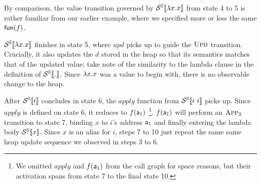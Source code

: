 By comparison, the value transition governed by $\mathcal{S}^{\mathbb{S}}\llbracket {\lambda x. x} \rrbracket$ from state
4 to 5 is rather familiar from our earlier example, where we specified more or
less the same $\mathsf{fun}(f)$.

$\mathcal{S}^{\mathbb{S}}\llbracket {\lambda x. x} \rrbracket$ finishes in state 5, where $upd$ picks up to guide the
$\textsc{Upd}$ transition. Crucially, it also updates the $d$ stored in the heap
so that its semantics matches that of the updated value; take note of the
similarity to the lambda clause in the definition of $\semst{\wild}$. Since
$\lambda x. x$ was a value to begin with, there is no observable change to the
heap.

After $\mathcal{S}^{\mathbb{S}}\llbracket {i} \rrbracket$ concludes in state 6, the $apply$ function from $\mathcal{S}^{\mathbb{S}}\llbracket {i~i} \rrbracket$
picks up. Since $apply$ is defined on state 6, it reduces to $f(\mathsf{a}_1)$%
\footnote{We omitted $apply$ and $f(\mathsf{a}_1)$ from the call graph for space reasons, but
their activation spans from state 7 to the final state 10.}.
$f(\mathsf{a}_1)$ will perform an $\textsc{App}_2$ transition to state 7, binding $x$ to $i$'s
address $\mathsf{a}_1$ and finally entering the lambda body $\mathcal{S}^{\mathbb{S}}\llbracket {x} \rrbracket$. Since $x$ is
an alias for $i$, steps 7 to 10 just repeat the same same heap update sequence
we observed in steps 3 to 6.

